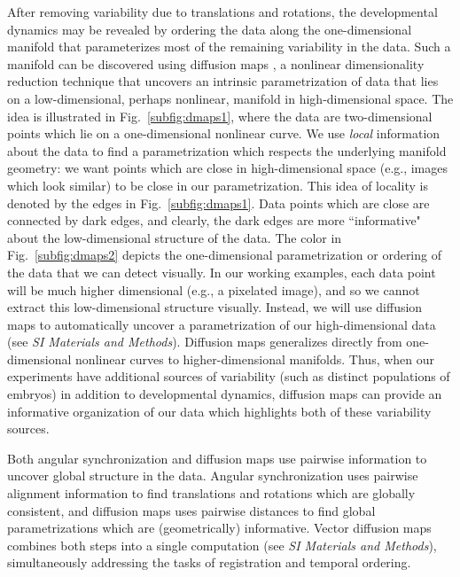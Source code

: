 \documentclass{pnastwo}
\newcommand{\SI}[0]{{\it SI Materials and Methods}}
\newcommand{\fig}[0]{Fig.}
\begin{document}
\begin{article}
%
After removing variability due to translations and rotations, the developmental dynamics may be revealed by ordering the data along the one-dimensional manifold that parameterizes most of the remaining variability in the data.
%
Such a manifold can be discovered using diffusion maps \cite{coifman2005geometric}, a nonlinear dimensionality reduction technique that uncovers an intrinsic parametrization of data that lies on a low-dimensional, perhaps nonlinear, manifold in high-dimensional space.
%
The idea is illustrated in \fig~\ref{subfig:dmaps1}, where the data are two-dimensional points which lie on a one-dimensional nonlinear curve.
%
We use {\it local} information about the data to find a parametrization  which respects the underlying manifold geometry: we want points which are close in high-dimensional space (e.g., images which look similar) to be close in our parametrization.
%
This idea of locality is denoted by the edges in \fig~\ref{subfig:dmaps1}.
%
Data points which are close are connected by dark edges, and clearly, the dark edges are more ``informative" about the low-dimensional structure of the data.
%
The color in \fig~\ref{subfig:dmaps2} depicts the one-dimensional parametrization or ordering of the data that we can detect visually.
%
In our working examples, each data point will be much higher dimensional (e.g., a pixelated image), and so we cannot extract this low-dimensional structure visually.
%
Instead, we will use diffusion maps to automatically uncover a parametrization of our high-dimensional data (see \SI).
%
Diffusion maps generalizes directly from one-dimensional nonlinear curves to higher-dimensional manifolds.
%
Thus, when our experiments have additional sources of variability (such as distinct populations of embryos) in addition to developmental dynamics, diffusion maps can provide an informative organization of our data which highlights both of these variability sources.

Both angular synchronization and diffusion maps use pairwise information to uncover global structure in the data.
%
Angular synchronization uses pairwise alignment information to find translations and rotations which are globally consistent, and diffusion maps uses pairwise distances to find global parametrizations which are (geometrically) informative.
%
Vector diffusion maps combines both steps into a single computation (see \SI), simultaneously addressing the tasks of registration and temporal ordering.
%
%
%


\end{article}
\end{document}

